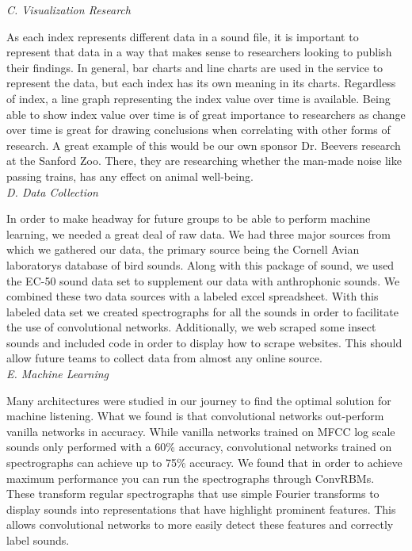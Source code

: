 \begin{flushleft}
\noindent\textit{C. Visualization Research}\par
As each index represents different data in a sound file, it is important to represent that data in a way that makes sense to researchers looking to publish their findings. In general, bar charts and line charts are used in the service to represent the data, but each index has its own meaning in its charts. Regardless of index, a line graph representing the index value over time is available. Being able to show index value over time is of great importance to researchers as change over time is great for drawing conclusions when correlating with other forms of research. A great example of this would be our own sponsor Dr. Beever\textquotesingle s research at the Sanford Zoo. There, they are researching whether the man-made noise like passing trains, has any effect on animal well-being.\\[4pt]

\noindent\textit{D. Data Collection}\par
In order to make headway for future groups to be able to perform machine learning, we needed a great deal of raw data. We had three major sources from which we gathered our data, the primary source being the Cornell Avian laboratory\textquotesingle s database of bird sounds. Along with this package of sound, we used the EC-50 sound data set to supplement our data with anthrophonic sounds. We combined these two data sources with a labeled excel spreadsheet. With this labeled data set we created spectrographs for all the sounds in order to facilitate the use of convolutional networks. Additionally, we web scraped some insect sounds and included code in order to display how to scrape websites. This should allow future teams to collect data from almost any online source.\\[4pt]

\noindent\textit{E. Machine Learning}\par
Many architectures were studied in our journey to find the optimal solution for machine listening. What we found is that convolutional networks out-perform vanilla networks in accuracy. While vanilla networks trained on MFCC log scale sounds only performed with a 60\% accuracy, convolutional networks trained on spectrographs can achieve up to 75\% accuracy. We found that in order to achieve maximum performance you can run the spectrographs through ConvRBMs. These transform regular spectrographs that use simple Fourier transforms to display sounds into representations that have highlight prominent features. This allows convolutional networks to more easily detect these features and correctly label sounds.

\end{flushleft}
